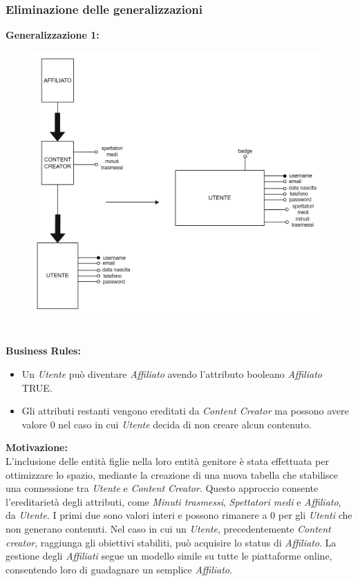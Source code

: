 \subsubsection{Eliminazione delle generalizzazioni}
\textbf{Generalizzazione 1:}\\
\begin{figure}[h]
    \centering
    \includegraphics[scale = 0.5]{img/generalizzazione1.png}
\end{figure}\\
\textbf{Business Rules:}
\begin{itemize}
    \item Un \textit{Utente} può diventare \textit{Affiliato} avendo l'attributo booleano \textit{Affiliato} TRUE.
    \item Gli attributi restanti vengono ereditati da \textit{Content Creator} ma possono avere valore 0 nel caso in cui \textit{Utente} decida di non creare alcun contenuto.
\end{itemize}
\textbf{Motivazione:}\\
    L'inclusione delle entità figlie nella loro entità genitore è stata effettuata per ottimizzare lo spazio, mediante la creazione di una nuova tabella che stabilisce una connessione tra \textit{Utente} e \textit{Content Creator}. Questo approccio consente l'ereditarietà degli attributi, come \textit{Minuti trasmessi}, \textit{Spettatori medi} e \textit{Affiliato}, da \textit{Utente}. I primi due sono valori interi e possono rimanere a 0 per gli \textit{Utenti} che non generano contenuti. Nel caso in cui un \textit{Utente}, precedentemente \textit{Content creator}, raggiunga gli obiettivi stabiliti, può acquisire lo status di \textit{Affiliato}. La gestione degli \textit{Affiliati} segue un modello simile su tutte le piattaforme online, consentendo loro di guadagnare un semplice \textit{Affiliato}.


